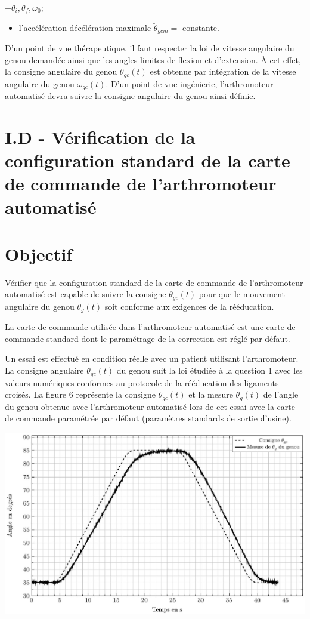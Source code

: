 \documentclass[10pt]{article}
\begin{document}
$-\theta_{i}, \theta_{f}, \omega_{0} ;$

\begin{itemize}
  \item l'accélération-décélération maximale $\ddot{\theta}_{g c m}=$ constante.
\end{itemize}

D'un point de vue thérapeutique, il faut respecter la loi de vitesse angulaire du genou demandée ainsi que les angles limites de flexion et d'extension. À cet effet, la consigne angulaire du genou $\theta_{g c}(t)$ est obtenue par intégration de la vitesse angulaire du genou $\omega_{g c}(t)$. D'un point de vue ingénierie, l'arthromoteur automatisé devra suivre la consigne angulaire du genou ainsi définie.

\section*{I.D - Vérification de la configuration standard de la carte de commande de l'arthromoteur automatisé}
\section*{Objectif}
Vérifier que la configuration standard de la carte de commande de l'arthromoteur automatisé est capable de suivre la consigne $\theta_{g c}(t)$ pour que le mouvement angulaire du genou $\theta_{g}(t)$ soit conforme aux exigences de la rééducation.

La carte de commande utilisée dans l'arthromoteur automatisé est une carte de commande standard dont le paramétrage de la correction est réglé par défaut.

Un essai est effectué en condition réelle avec un patient utilisant l'arthromoteur. La consigne angulaire $\theta_{g c}(t)$ du genou suit la loi étudiée à la question 1 avec les valeurs numériques conformes au protocole de la rééducation des ligaments croisés. La figure 6 représente la consigne $\theta_{g c}(t)$ et la mesure $\theta_{g}(t)$ de l'angle du genou obtenue avec l'arthromoteur automatisé lors de cet essai avec la carte de commande paramétrée par défaut (paramètres standards de sortie d'usine).

\begin{center}
\includegraphics[max width=\textwidth]{2024_07_14_a83aebba33898893d39fg-04}
\end{center}
\end{document}
